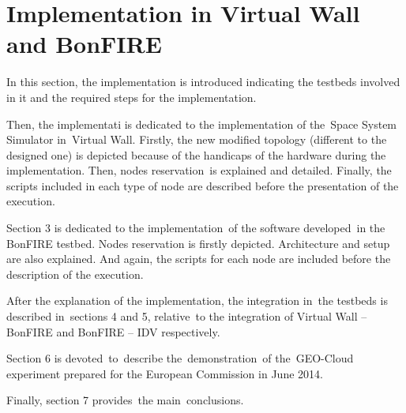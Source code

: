 
\chapter{Implementation in Virtual Wall and BonFIRE}




In this section, the implementation is introduced indicating the testbeds involved in it and the required steps for the implementation.

Then, the implementati is dedicated to the implementation of the\ Space System
Simulator in\ Virtual Wall. Firstly, the new modified topology
(different to the designed one) is depicted because of the handicaps of
the hardware during the implementation. Then, nodes reservation\ is
explained and detailed. Finally, the scripts included in each type of
node are described before the presentation of the execution.


Section 3 is dedicated to the implementation\ of the software
developed\ in the BonFIRE testbed. Nodes reservation is firstly
depicted. Architecture and setup are also explained. And again, the
scripts for each node are included before the description of the
execution.


After the explanation of the implementation, the integration in\ the
testbeds is described in\ sections 4 and 5, relative\ to the
integration of Virtual Wall -- BonFIRE and BonFIRE -- IDV respectively.

Section 6 is devoted\ to\ describe the\ demonstration\ of the\ GEO-Cloud
experiment prepared for the European Commission in June 2014.


\bigskip

Finally, section 7 provides\ the main\ conclusions.



